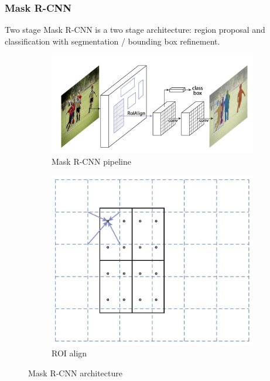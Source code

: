 \documentclass{beamer}
\begin{document}
\begin{frame}
    \frametitle{Mask R-CNN}

    \begin{block}{Two stage}
        Mask R-CNN is a two stage architecture: region proposal
        and classification with segmentation / bounding box refinement.
    \end{block}

    \begin{figure}[h]
        \begin{subfigure}{0.65\textwidth}
            \includegraphics[width=\textwidth]{mask_rcnn.png}
            \caption{Mask R-CNN pipeline}
        \end{subfigure}
        \begin{subfigure}{0.34\textwidth}
            \includegraphics[width=\textwidth]{roi_align.png}
            \caption{ROI align}
        \end{subfigure}
        \caption{Mask R-CNN architecture \cite{he2017mask}}
    \end{figure}

\end{frame}
\end{document}

